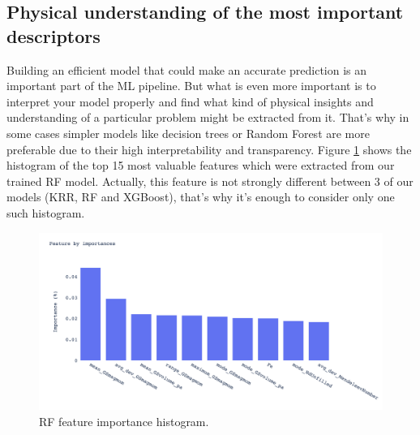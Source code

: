 \subsection{Physical understanding of the most important descriptors}

Building an efficient model that could make an accurate prediction is an important part of the ML pipeline. But what is even more important is to interpret your model properly and find what kind of physical insights and understanding of a particular problem might be extracted from it. That's why in some cases simpler models like decision trees or Random Forest are more preferable due to their high interpretability and transparency.
Figure \ref{fig:rf_features} shows the histogram of the top 15 most valuable features which were extracted from our trained RF model. Actually, this feature is not strongly different between 3 of our models (KRR, RF and XGBoost), that's why it's enough to consider only one such histogram.

\begin{figure}[H]
	\centering
	\includegraphics[width=140mm]{fig/ml_fig/rf_features.png}
	\caption[RF feature importance histogram.]{RF feature importance histogram.}
\label{fig:rf_features}
\end{figure}

